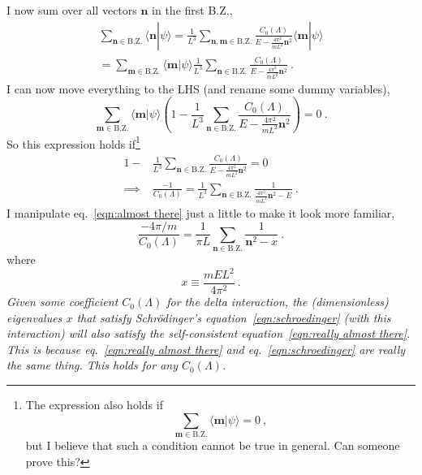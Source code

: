 \documentclass[11pt]{article}
\begin{document}
I now sum over all vectors $\bm n$ in the first B.Z.,
\begin{multline}
\sum_{\bm n\in \mathrm{B.Z.}}\langle \bm n|\psi\rangle =\frac{1}{L^3} \sum_{\bm n,\bm m\in\mathrm{B.Z.}}\frac{C_0(\Lambda)}{E-\frac{4\pi^2}{mL^2}\bm n^2} \langle \bm m|\psi\rangle\\
=\sum_{\bm m\in \mathrm{B.Z.}}\langle \bm m|\psi\rangle\frac{1}{L^3} \sum_{\bm n\in\mathrm{B.Z.}}\frac{C_0(\Lambda)}{E-\frac{4\pi^2}{mL^2}\bm n^2}\ .
\end{multline}
I can now move everything to the LHS (and rename some dummy variables),
\begin{equation}
\sum_{\bm m\in \mathrm{B.Z.}}\langle \bm m|\psi\rangle\left(1-\frac{1}{L^3} \sum_{\bm n\in\mathrm{B.Z.}}\frac{C_0(\Lambda)}{E-\frac{4\pi^2}{mL^2}\bm n^2}\right)=0\ .
\end{equation}
So this expression holds if\footnote{The expression also holds if
\begin{displaymath}
\sum_{\bm m\in \mathrm{B.Z.}}\langle \bm m|\psi\rangle=0\ ,
\end{displaymath}
but I believe that such a condition cannot be true in general.  Can someone prove this?}
\begin{align}
1-&\frac{1}{L^3} \sum_{\bm n\in\mathrm{B.Z.}}\frac{C_0(\Lambda)}{E-\frac{4\pi^2}{mL^2}\bm n^2}=0\nonumber\\
\implies& \frac{-1}{C_0(\Lambda)}=\frac{1}{L^3}\sum_{\bm n\in\mathrm{B.Z.}}\frac{1}{\frac{4\pi^2}{mL^2}\bm n^2-E}\ .\label{eqn:almost there}
\end{align}
I manipulate eq.~\eqref{eqn:almost there} just a little to make it look more familiar,
\begin{equation}
 \frac{-4\pi/m}{C_0(\Lambda)}=\frac{1}{\pi L}\sum_{\bm n\in\mathrm{B.Z.}}\frac{1}{\bm n^2-x}\ .\label{eqn:really almost there}
 \end{equation}
 where 
 \begin{equation}
 x\equiv \frac{mEL^2}{4\pi^2}\ .
 \end{equation}
\emph{Given some coefficient $C_0(\Lambda)$ for the delta interaction, the (dimensionless) eigenvalues $x$ that satisfy Schr\"odinger's equation~\eqref{eqn:schroedinger} (with this interaction) will also satisfy the self-consistent equation~\eqref{eqn:really almost there}.  This is because eq.~\eqref{eqn:really almost there} and eq.~\eqref{eqn:schroedinger} are really the same thing.  This holds for \emph{any} $C_0(\Lambda)$.}
\end{document}
